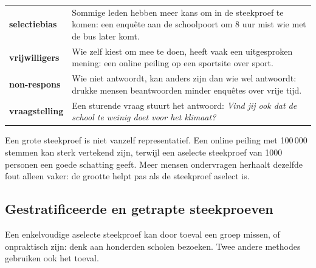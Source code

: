 {\renewcommand{\arraystretch}{1.4}%
\begin{tabular}{@{}>{\RaggedRight\arraybackslash\bfseries}p{3.6cm}>{\RaggedRight\arraybackslash}p{12cm}@{}}
selectiebias & Sommige leden hebben meer kans om in de steekproef te komen: een enquête aan de schoolpoort om 8 uur mist wie met de bus later komt. \\
vrijwilligers & Wie zelf kiest om mee te doen, heeft vaak een uitgesproken mening: een online peiling op een sportsite over sport. \\
non-respons & Wie niet antwoordt, kan anders zijn dan wie wel antwoordt: drukke mensen beantwoorden minder enquêtes over vrije tijd. \\
vraagstelling & Een sturende vraag stuurt het antwoord: \textit{Vind jij ook dat de school te weinig doet voor het klimaat?}
\end{tabular}\par}

Een grote steekproef is niet vanzelf representatief. Een online peiling met 100\,000 stemmen kan sterk vertekend zijn, terwijl een aselecte steekproef van 1000 personen een goede schatting geeft. Meer mensen ondervragen herhaalt dezelfde fout alleen vaker: de grootte helpt pas als de steekproef aselect is.


\begin{oefeningen}
\end{oefeningen}

\subsection{Gestratificeerde en getrapte steekproeven}

Een enkelvoudige aselecte steekproef kan door toeval een groep missen, of onpraktisch zijn: denk aan honderden scholen bezoeken. Twee andere methodes gebruiken ook het toeval.

